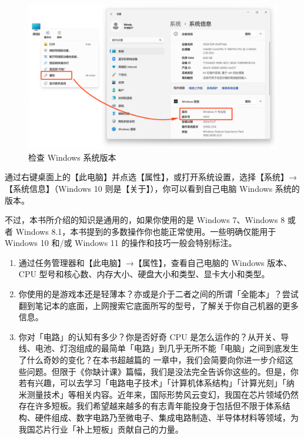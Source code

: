 \begin{figure}[htb!]
  \centering
  \includegraphics[width=.7\textwidth]{assets/basic/Check_Windows_version.png}
  \caption{检查 Windows 系统版本}
  \label{fig:check-windows-version}
\end{figure}

通过右键桌面上的【此电脑】并点选【属性】，或打开系统设置，选择【系统】→【系统信息】（Windows 10 则是【关于】），你可以看到自己电脑 Windows 系统的版本。

不过，本书所介绍的知识是通用的，如果你使用的是 Windows 7、Windows 8 或者 Windows 8.1，本书提到的多数操作你也能正常使用。一些明确仅能用于 Windows 10 和/或 Windows 11 的操作和技巧一般会特别标注。

\practice

\begin{enumerate}
  \item 通过任务管理器和【此电脑】→【属性】，查看自己电脑的 Windows 版本、CPU 型号和核心数、内存大小、硬盘大小和类型、显卡大小和类型。
  \item 你使用的是游戏本还是轻薄本？亦或是介于二者之间的所谓「全能本」？尝试翻到笔记本的底面，上网搜索它底面所写的型号，了解关于你自己机器的更多信息。
  \item 你对「电路」的认知有多少？你是否好奇 CPU 是怎么运作的？从开关、导线、电池、灯泡组成的最简单「电路」到几乎无所不能「电脑」之间到底发生了什么奇妙的变化？在本书超越篇的 一章中，我们会简要向你进一步介绍这些问题。但限于《你缺计课》篇幅，我们是没法完全告诉你这些的。但是，你若有兴趣，可以去学习「电路电子技术」「计算机体系结构」「计算光刻」「纳米测量技术」等相关内容。近年来，国际形势风云变幻，我国在芯片领域仍然存在许多短板。我们希望越来越多的有志青年能投身于包括但不限于体系结构、硬件组成、数字电路乃至微电子、集成电路制造、半导体材料等领域，为我国芯片行业「补上短板」贡献自己的力量。
\end{enumerate}
